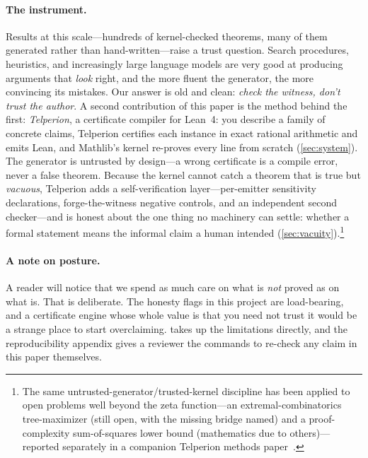 \paragraph{The instrument.} Results at this scale---hundreds of kernel-checked
theorems, many of them generated rather than hand-written---raise a trust
question. Search procedures, heuristics, and increasingly large language models
are very good at producing arguments that \emph{look} right, and the more
fluent the generator, the more convincing its mistakes. Our answer is old and
clean: \emph{check the witness, don't trust the author}. A second contribution
of this paper is the method behind the first: \emph{Telperion}, a certificate
compiler for Lean~4: you
describe a family of concrete claims, Telperion certifies each instance in
exact rational arithmetic and emits Lean, and Mathlib's kernel re-proves every
line from scratch (\cref{sec:system}). The generator is untrusted by design---a
wrong certificate is a compile error, never a false theorem. Because the kernel
cannot catch a theorem that is true but \emph{vacuous}, Telperion adds a
self-verification layer---per-emitter sensitivity declarations,
forge-the-witness negative controls, and an independent second checker---and is
honest about the one thing no machinery can settle: whether a formal statement
means the informal claim a human intended (\cref{sec:vacuity}).\footnote{The
same untrusted-generator/trusted-kernel discipline has been applied to open
problems well beyond the zeta function---an extremal-combinatorics tree-maximizer
(still open, with the missing bridge named) and a proof-complexity sum-of-squares
lower bound (mathematics due to others)---reported separately in a companion
Telperion methods paper~\cite{telperion-companion}.}

\paragraph{A note on posture.} A reader will notice that we spend as much care
on what is \emph{not} proved as on what is. That is deliberate. The honesty
flags in this project are load-bearing, and a certificate engine whose whole
value is that you need not trust it would be a strange place to start
overclaiming.  takes up the limitations directly, and the
reproducibility appendix gives a reviewer the commands to re-check any claim in
this paper themselves.
